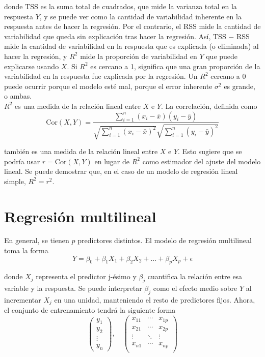 \noindent donde TSS es la suma total de cuadrados, que mide la varianza total en la respuesta $Y$, y se puede ver como la cantidad de variabilidad inherente en la respuesta antes de hacer la regresión. Por el contrario, el RSS mide la cantidad de variabilidad que queda sin explicación tras hacer la regresión. Así, TSS $-$ RSS mide la cantidad de variabilidad en la respuesta que es explicada (o eliminada) al hacer la regresión, y $R^2$ mide la proporción de variabilidad en $Y$ que puede explicarse usando $X$. Si $R^2$ es cercano a 1, significa que una gran proporción de la variabilidad en la respuesta fue explicada por la regresión. Un $R^2$ cercano a 0 puede ocurrir porque el modelo esté mal,  porque el error inherente $\sigma^2$ es grande, o ambas. \\

\noindent $R^2$ es una medida de la relación lineal entre $X$ e $Y$. La correlación, definida como 
\begin{equation}
\text{Cor}(X, Y) = \frac{\sum_{i=1}^n (x_i - \bar{x})(y_i - \bar{y})}{\sqrt{\sum_{i=1}^n(x_i - \bar{x})^2}\sqrt{\sum_{i=1}^n (y_i - \bar{y})^2}} 
\end{equation}

\noindent también es una medida de la relación lineal entre $X$ e $Y$. Esto sugiere que se podría usar $r = \text{Cor}(X, Y)$ en lugar de $R^2$ como estimador del ajuste del modelo lineal. Se puede demostrar que, en el caso de un modelo de regresión lineal simple, $R^2 = r^2$. 

\section{Regresión multilineal}

En general, se tienen $p$ predictores distintos. El modelo de regresión multilineal toma la forma 
\begin{equation}
Y = \beta_0 + \beta_1 X_1 + \beta_2 X_2 + \dots + \beta_p X_p + \epsilon
\end{equation}

\noindent donde $X_j$ representa el predictor j-ésimo y $\beta_j$ cuantifica la relación entre esa variable y la respuesta. Se puede interpretar $\beta_j$ como el efecto medio sobre $Y$ al incrementar $X_j$ en una unidad, manteniendo el resto de predictores fijos. Ahora, el conjunto de entrenamiento tendrá la siguiente forma 
\begin{equation}
\begin{pmatrix}
y_1 \\
y_2 \\
\vdots \\
y_n
\end{pmatrix}, \quad 
\begin{pmatrix}
x_{11} & \cdots & x_{1p} \\
x_{21} & \cdots & x_{2p} \\
\vdots & \ddots & \vdots \\
x_{n1} & \cdots & x_{np} \\
\end{pmatrix}
\end{equation}

